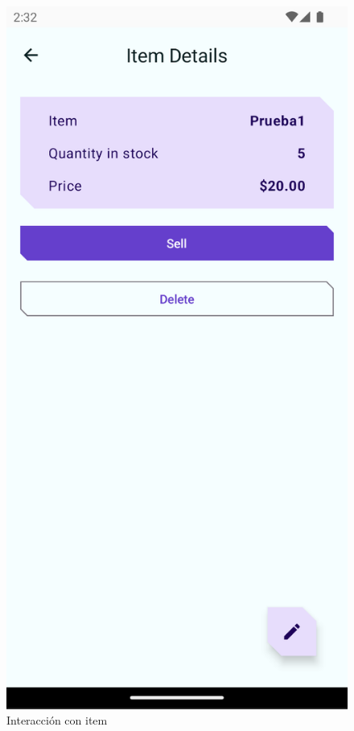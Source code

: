 \documentclass{article}
\begin{document}
        \begin{figure}[H]
            \centerline{\includegraphics[scale=0.3]{codelab2_4.png}}
            \caption{Interacción con item}
            \label{fig:codelab2_4}
        \end{figure}
\end{document}
